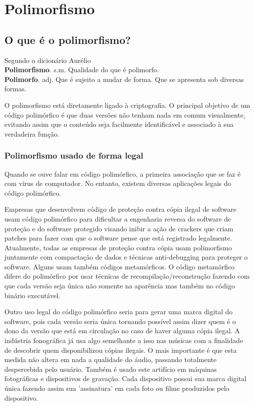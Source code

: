 \chapter{Polimorfismo}

\section{O que é o polimorfismo?}

	Segundo o dicionário Aurélio\cite{Aurelio:1}\\
\textbf{Polimorfismo}. s.m. Qualidade do que é polimorfo.\\
\textbf{Polimorfo}. adj. Que é sujeito a mudar de forma. Que se apresenta sob diversas formas.


O polimorfismo está diretamente ligado à criptografia. O principal objetivo de um código polimórfico é que duas versões não tenham nada em comum visualmente, evitando assim que o conteúdo seja facilmente identificável e associado à sua verdadeira função. 

\subsection{Polimorfismo usado de forma legal}
Quando se ouve falar em código polimórfico, a primeira associação que se faz é com vírus de computador. No entanto, existem diversas aplicações legais do código polimórfico.

Empresas que desenvolvem código de proteção contra cópia ilegal de software usam código polimórfico para dificultar a engenharia reversa do software de proteção e do software protegido visando inibir a ação de crackers que criam patches para fazer com que o software pense que está registrado legalmente\cite{soft:1,soft:2}. Atualmente, todas as empresas de proteção contra cópia usam polimorfismo juntamente com compactação de dados e técnicas anti-debugging para proteger o software. Alguns usam também códigos metamórficos. O código metamórfico difere do polimórfico por usar técnicas de recompilação/reconstrução fazendo com que cada versão seja única não somente na aparência mas também no código binário executável.

Outro uso legal do código polimórfico seria para gerar uma marca digital do software, pois cada versão seria única tornando possível assim dizer quem é o dono da versão que está em circulação no caso de haver alguma cópia ilegal. A indústria fonográfica já usa algo semelhante a isso nas músicas\cite{wiki:3} com a finalidade de descobrir quem disponibilizou cópias ilegais. O mais importante é que esta medida não altera em nada a qualidade do áudio, passando totalmente despercebida pelo usuário. Também é usado este artifício em máquinas fotográficas e dispositivos de gravação. Cada dispositivo possui sua marca digital única fazendo assim sua 'assinatura' em cada foto ou filme produzidos pelo dispositivo.

